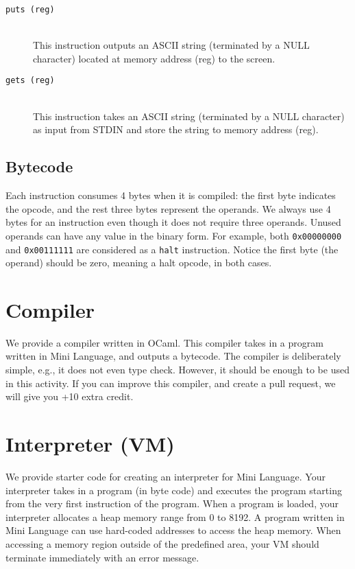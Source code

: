 \documentclass[a4paper, 11pt]{article}
\theoremstyle{definition}
\begin{document}
{\begin{description}
  \item [\texttt{puts (reg)}]~\\
    This instruction outputs an ASCII string (terminated by a NULL
    character) located at memory address (reg) to the screen.

  \item [\texttt{gets (reg)}]~\\
    This instruction takes an ASCII string (terminated by a NULL
    character) as input from STDIN and store the string to memory
    address (reg).

\end{description}

\subsection{Bytecode}

Each instruction consumes 4 bytes when it is compiled: the first byte
indicates the opcode, and the rest three bytes represent the operands.
We always use 4 bytes for an instruction even though it does not
require three operands. Unused operands can have any value in the
binary form. For example, both \texttt{0x00000000} and
\texttt{0x00111111} are considered as a \texttt{halt} instruction.
Notice the first byte (the operand) should be zero, meaning a halt
opcode, in both cases.

\section{Compiler}

We provide a compiler written in OCaml. This compiler takes in a
program written in Mini Language, and outputs a bytecode. The compiler
is deliberately simple, e.g., it does not even type check. However, it
should be enough to be used in this activity. If you can improve this
compiler, and create a pull request, we will give you +10 extra
credit.

\section{Interpreter (VM)}

We provide starter code for creating an interpreter for Mini Language.
Your interpreter takes in a program (in byte code) and executes the
program starting from the very first instruction of the program. When
a program is loaded, your interpreter allocates a heap memory range
from 0 to 8192. A program written in Mini Language can use hard-coded
addresses to access the heap memory. When accessing a memory region
outside of the predefined area, your VM should terminate immediately
with an error message.

}
\end{document}
